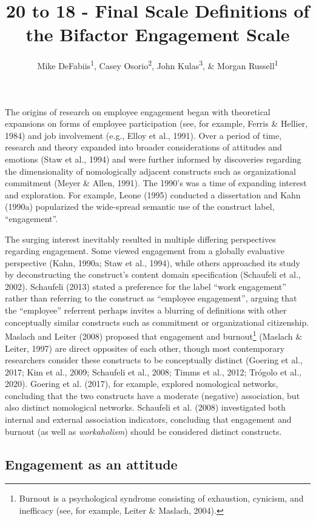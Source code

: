 \documentclass[
  man]{apa6}
\title{20 to 18 - Final Scale Definitions of the Bifactor Engagement Scale}
\author{Mike DeFabiis\textsuperscript{1}, Casey Osorio\textsuperscript{2}, John Kulas\textsuperscript{3}, \& Morgan Russell\textsuperscript{1}}
\date{}
\affiliation{\vspace{0.5cm}\textsuperscript{1} Montclair State University\\\textsuperscript{2} Harver\\\textsuperscript{3} eRg}
\begin{document}
\maketitle

The origins of research on employee engagement began with theoretical expansions on forms of employee participation (see, for example, Ferris \& Hellier, 1984) and job involvement (e.g., Elloy et al., 1991). Over a period of time, research and theory expanded into broader considerations of attitudes and emotions (Staw et al., 1994) and were further informed by discoveries regarding the dimensionality of nomologically adjacent constructs such as organizational commitment (Meyer \& Allen, 1991). The 1990's was a time of expanding interest and exploration. For example, Leone (1995) conducted a dissertation and Kahn (1990a) popularized the wide-spread semantic use of the construct label, ``engagement''.

The surging interest inevitably resulted in multiple differing perspectives regarding engagement. Some viewed engagement from a globally evaluative perspective (Kahn, 1990a; Staw et al., 1994), while others approached its study by deconstructing the construct's content domain specification (Schaufeli et al., 2002). Schaufeli (2013) stated a preference for the label ``work engagement'' rather than referring to the construct as ``employee engagement'', arguing that the ``employee'' referrent perhaps invites a blurring of definitions with other conceptually similar constructs such as commitment or organizational citizenship. Maslach and Leiter (2008) proposed that engagement and burnout\footnote{Burnout is a psychological syndrome consisting of exhaustion, cynicism, and inefficacy (see, for example, Leiter \& Maslach, 2004).} (Maslach \& Leiter, 1997) are direct opposites of each other, though most contemporary researchers consider these constructs to be conceptually distinct (Goering et al., 2017; Kim et al., 2009; Schaufeli et al., 2008; Timms et al., 2012; Trógolo et al., 2020). Goering et al. (2017), for example, explored nomological networks, concluding that the two constructs have a moderate (negative) association, but also distinct nomological networks. Schaufeli et al. (2008) investigated both internal and external association indicators, concluding that engagement and burnout (as well as \emph{workaholism}) should be considered distinct constructs.

\hypertarget{engagement-as-an-attitude}{%
\subsection{Engagement as an attitude}\label{engagement-as-an-attitude}}
\end{document}

